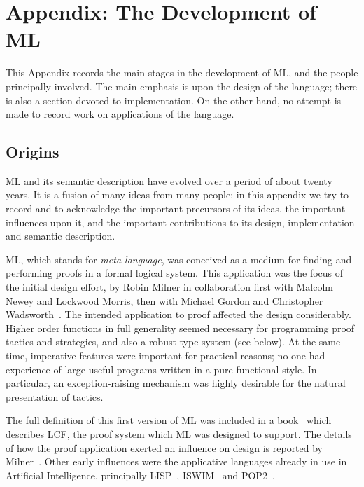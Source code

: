 %
\section{Appendix: The Development of ML}
\label{story-app}

This Appendix records the main stages in the development of ML, and the people
principally involved.  The main emphasis is upon the design of the language;
there is also a section devoted to implementation. On the other hand, no
attempt is made to record work on applications of the language.
\subsection*{Origins}

ML and its semantic description have evolved over a period of about
twenty years.  It is a fusion of many ideas from many people;  in this
appendix we try to record and to acknowledge the important precursors
of its ideas, the important influences upon it, and the important
contributions to its design, implementation and semantic description.

ML, which stands for {\em meta language}, was conceived as a medium for
finding and performing proofs in a formal logical system.  This application
was the focus of the initial design effort, by Robin Milner in collaboration
first with Malcolm Newey and Lockwood Morris, then with Michael Gordon and
Christopher Wadsworth~\cite{GMMNW}. The intended application to proof affected
the design considerably.  Higher order functions in full generality seemed
necessary for programming proof tactics and strategies, and also a robust type
system (see below).  At the same time, imperative features were important for
practical reasons; no-one had experience of large useful programs written in a
pure functional style. In particular, an exception-raising mechanism was
highly desirable for the natural presentation of tactics.

The full definition of this first version of ML was included in a
book~\cite{GMW} which describes LCF, the proof system which ML was designed to
support.  The details of how the proof application exerted an influence on
design is reported by Milner~\cite{Mil2}.  Other early influences were the
applicative languages already in use in Artificial Intelligence, principally
LISP~\cite{McC}, ISWIM~\cite{Lan} and POP2~\cite{BP}.

